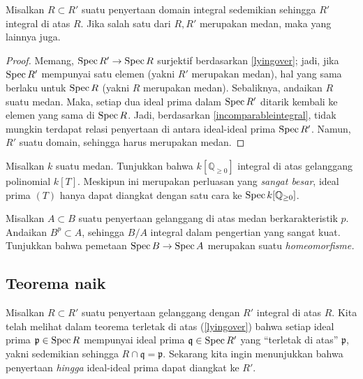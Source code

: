 \begin{corollary} 
Misalkan $R \subset R'$ suatu penyertaan domain integral sedemikian sehingga $R'$
integral di atas $R$. Jika salah satu dari $R, R'$ merupakan medan, maka yang lainnya juga.
\end{corollary} 
\begin{proof} 
Memang, $\operatorname{Spec} R' \to \operatorname{Spec} R$ surjektif berdasarkan \cref{lyingover}; jadi, jika $\operatorname{Spec}
R'$ mempunyai satu elemen (yakni $R'$ merupakan medan), hal yang sama berlaku untuk $\operatorname{Spec} R$
(yakni $R$ merupakan medan). Sebaliknya, andaikan $R$ suatu medan. 
Maka, setiap dua ideal prima dalam $\operatorname{Spec} R'$ ditarik kembali ke elemen yang sama di $\operatorname{Spec}
R$. Jadi, berdasarkan \cref{incomparableintegral}, tidak mungkin terdapat relasi penyertaan di antara ideal-ideal prima $\operatorname{Spec}
R'$. Namun, $R'$ suatu domain, sehingga harus merupakan medan.
\end{proof} 


\begin{exercise} Misalkan $k$ suatu medan.
Tunjukkan bahwa $k[\mathbb{Q}_{\geq 0}]$ integral di atas gelanggang polinomial $k[T]$.
Meskipun ini merupakan perluasan yang \emph{sangat besar}, ideal prima $(T)$ hanya dapat diangkat
dengan satu cara ke $\operatorname{Spec} k[\mathbb{Q}_{\geq 0}]$.
\end{exercise} 

\begin{exercise} 
Misalkan $A \subset B$ suatu penyertaan gelanggang di atas medan berkarakteristik
$p$. Andaikan $B^p \subset A$, sehingga $B/A$ integral dalam pengertian yang sangat kuat. 
Tunjukkan bahwa pemetaan $\operatorname{Spec} B \to \operatorname{Spec} A$ merupakan suatu \emph{homeomorfisme.} 
\end{exercise} 



\subsection{Teorema naik}
Misalkan $R \subset R'$ suatu penyertaan gelanggang dengan $R'$ integral di atas $R$. Kita telah melihat dalam
teorema terletak di atas (\cref{lyingover}) bahwa setiap ideal prima $\mathfrak{p} \in \operatorname{Spec} R$ 
mempunyai ideal prima $\mathfrak{q} \in \operatorname{Spec} R'$ yang “terletak di atas” $\mathfrak{p}$, yakni
sedemikian sehingga $R \cap \mathfrak{q} = \mathfrak{p}$.
Sekarang kita ingin menunjukkan bahwa penyertaan \emph{hingga} ideal-ideal prima dapat diangkat ke $R'$.

